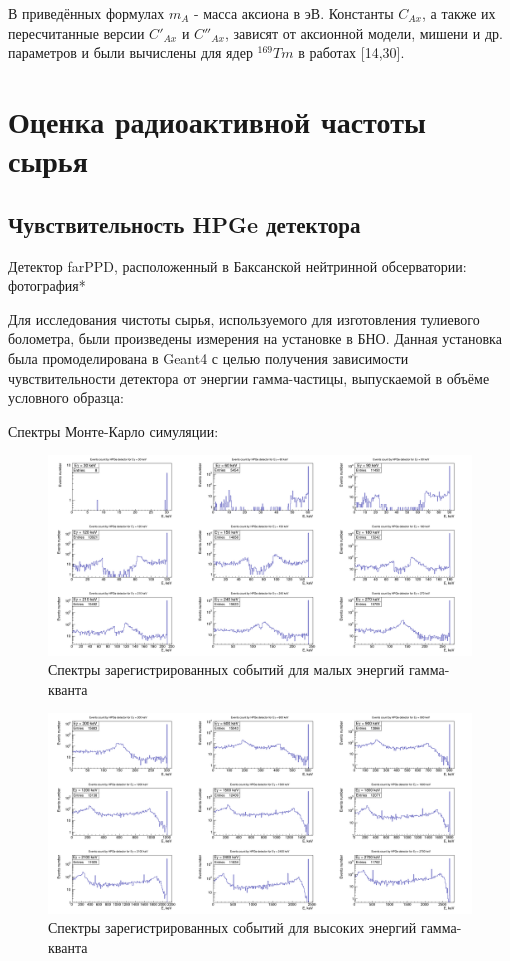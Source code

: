 \documentclass[a4paper,article,14pt]{extarticle}
\begin{document}
В приведённых формулах $m_A$ - масса аксиона в эВ. Константы $C_{Ax }$, а также их пересчитанные версии $C'_{Ax }$ и $C''_{Ax }$, зависят от аксионной модели, мишени и др. параметров и были вычислены для ядер $^{169}Tm$ в работах [14,30].

\section{Оценка радиоактивной частоты сырья}
\subsection{Чувствительность HPGe детектора}
Детектор farPPD, расположенный в Баксанской нейтринной обсерватории:
фотография*

Для исследования чистоты сырья, используемого для изготовления тулиевого болометра, были произведены измерения на установке в БНО. Данная установка была промоделирована в Geant4 с целью получения зависимости чувствительности детектора от энергии гамма-частицы, выпускаемой в объёме условного образца:

Спектры Монте-Карло симуляции:

\begin{figure}
    \centering
    \includegraphics[width =\textwidth]{images/Gamma30-270.png}
    \caption{Спектры зарегистрированных событий для малых энергий гамма-кванта}
    \label{fig:my_label}
\end{figure}


\begin{figure}
    \centering
    \includegraphics[width =\textwidth]{images/Gamma300-2700.png}
    \caption{Спектры зарегистрированных событий для высоких энергий гамма-кванта}
    \label{fig:my_label}
\end{figure}
\end{document}
